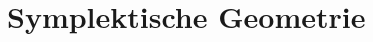 \chapter{Symplektische Geometrie}
\begin{comment}
Siehe
\begin{itemize}
\item Eilenberg.pdf
\end{itemize}
TODO:
\begin{itemize}
\item symplektische Struktur
\item momenten Abbildung
\item hamiltonsche Wirkung
\item symplektische quotienten
\begin{itemize}
    \item \cite[Section 5.4]{mcduff1998introduction}
\end{itemize}
\end{itemize}
\end{comment}

%
